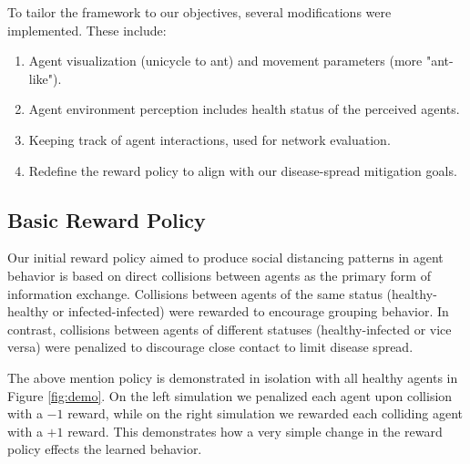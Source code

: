 \documentclass[9pt]{IEEEtran}
\begin{document}
To tailor the framework to our objectives, several modifications were implemented. These include:
\begin{enumerate}
    \item Agent visualization (unicycle to ant) and movement parameters (more "ant-like").
    \item Agent environment perception includes health status of the perceived agents.
    \item Keeping track of agent interactions, used for network evaluation.
    \item Redefine the reward policy to align with our disease-spread mitigation goals.
\end{enumerate}

\subsection{Basic Reward Policy}

Our initial reward policy aimed to produce social distancing patterns in agent behavior is based on direct collisions between agents as the primary form of information exchange. Collisions between agents of the same status (healthy-healthy or infected-infected) were rewarded to encourage grouping behavior. In contrast, collisions between agents of different statuses (healthy-infected or vice versa) were penalized to discourage close contact to limit disease spread.

The above mention policy is demonstrated in isolation with all healthy agents in Figure \ref{fig:demo}. On the left simulation we penalized each agent upon collision with a $-1$ reward, while on the right simulation we rewarded each colliding agent with a $+1$ reward. This demonstrates how a very simple change in the reward policy effects the learned behavior.
\end{document}
